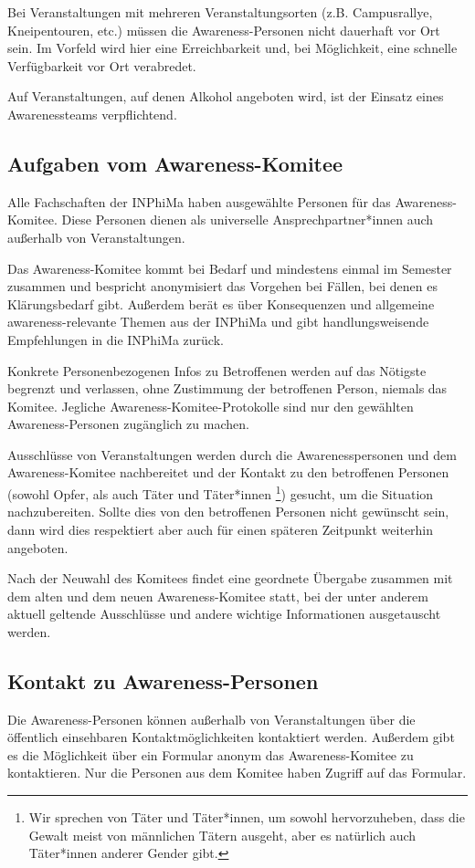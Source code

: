 \documentclass{article}
\begin{document}
Bei Veranstaltungen mit mehreren Veranstaltungsorten (z.B. Campusrallye, Kneipentouren, etc.) müs\-sen die Awareness-Personen nicht dauerhaft vor Ort sein. Im Vorfeld wird hier eine Erreichbarkeit und, bei Möglichkeit, eine schnelle Verfügbarkeit vor Ort verabredet.  

Auf Veranstaltungen, auf denen Alkohol angeboten wird, ist der Einsatz eines Awarenessteams verpflichtend.

\subsection{Aufgaben vom Awareness-Komitee}
Alle Fachschaften der INPhiMa haben ausgewählte Personen für das Awareness-Komitee. Diese Personen dienen als universelle Ansprechpartner*innen auch außerhalb von Veranstaltungen.

Das Awareness-Komitee kommt bei Bedarf und mindestens einmal im Semester zusammen und bespricht anonymisiert das Vorgehen bei Fällen, bei denen es Klärungsbedarf gibt. Außerdem berät es über Konsequenzen und allgemeine awareness-relevante Themen aus der INPhiMa und gibt handlungsweisende Empfehlungen in die INPhiMa zurück.  

Konkrete Personenbezogenen Infos zu Betroffenen werden auf das Nötigste begrenzt und verlassen, ohne Zustimmung der betroffenen Person, niemals das Komitee. Jegliche Awareness-Komitee-Protokolle sind nur den gewählten Awareness-Personen zugänglich zu machen.

Ausschlüsse von Veranstaltungen werden durch die Awarenesspersonen und dem Awareness-Komitee nachbereitet und der Kontakt zu den betroffenen Personen (sowohl Opfer, als auch Täter und Täter*innen \footnote{Wir sprechen von Täter und Täter*innen, um sowohl hervorzuheben, dass die Gewalt meist von männlichen Tätern ausgeht, aber es natürlich auch Täter*innen anderer Gender gibt.}) gesucht, um die Situation nachzubereiten. Sollte dies von den betroffenen Personen nicht gewünscht sein, dann wird dies respektiert aber auch für einen späteren Zeitpunkt weiterhin angeboten.

Nach der Neuwahl des Komitees findet eine geordnete Übergabe zusammen mit dem alten und dem neuen Awareness-Komitee statt, bei der unter anderem aktuell geltende Ausschlüsse und andere wichtige Informationen ausgetauscht werden.

\subsection{Kontakt zu Awareness-Personen}
Die Awareness-Personen können außerhalb von Veranstaltungen über die öffentlich einsehbaren Kontaktmöglichkeiten kontaktiert werden. %
Außerdem gibt es die Möglichkeit über ein Formular anonym das Awareness-Komitee zu kontaktieren. Nur die Personen aus dem Komitee haben Zugriff auf das Formular. %
\end{document}
